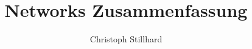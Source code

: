 \documentclass[10pt]{article}
\title{\textbf{Networks Zusammenfassung}}
\author{Christoph Stillhard}
\date{}
\begin{document}
\maketitle

\newcommand{\enumstart}{\begin{enumerate}}
\newcommand{\enumend}{\end{enumerate}}


\end{document}
